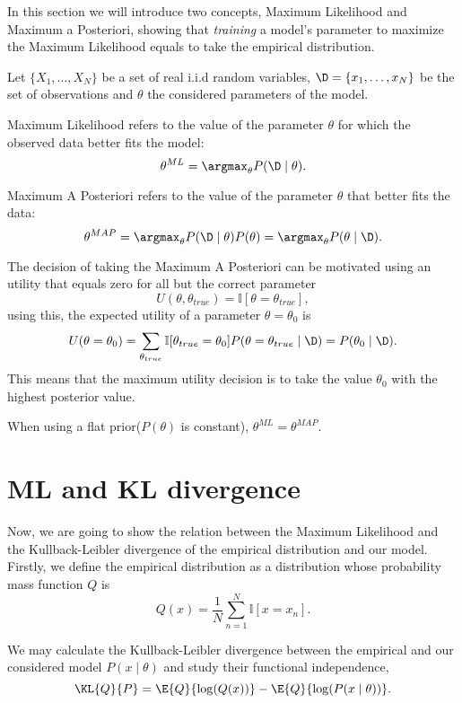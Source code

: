 
In this section we will introduce two concepts, Maximum Likelihood and Maximum a
Posteriori, showing that \emph{training} a model's parameter to maximize the
Maximum Likelihood equals to take the empirical distribution.

Let \(\{X_{1},\dots, X_{N}\}\) be a set of real i.i.d random variables, \(\D = \{x_{1}, \dots, x_{N}\}\) be the set of observations and \(\theta\) the considered parameters of the model.

\begin{definition}
  Maximum Likelihood refers to the value of the parameter \(\theta\) for which the observed data better fits the model:
  \[
    \theta^{ML} = \argmax_\theta P(\D \mid \theta).
  \]
\end{definition}

\begin{definition}
  Maximum A Posteriori refers to the value of the parameter \( \theta \) that better fits the data:
  \[
    \theta^{MAP} = \argmax_\theta P(\D \mid \theta)P(\theta) = \argmax_\theta P(\theta \mid \D).
  \]
\end{definition}

The decision of taking the Maximum A Posteriori can be motivated using an
utility that equals zero for all but the correct parameter
\[
  U(\theta, \theta_{true}) = \mathbb{I}[\theta = \theta_{true}],
\]
using this, the expected utility of a parameter \(\theta = \theta_0\) is
\[
  U(\theta = \theta_0) = \sum_{\theta_{true}}\mathbb{I}[\theta_{true} = \theta_0]P(\theta = \theta_{true}  \mid  \D) = P(\theta_0  \mid  \D).
\]
This means that the maximum utility decision is to take the value \(\theta_0\)
with the highest posterior value.

\begin{remark}
  When using a flat prior(\(P(\theta)\) is constant), \(\theta^{ML}= \theta ^{MAP}\).
\end{remark}

\section{ML and KL divergence}

Now, we are going to show the relation between the Maximum Likelihood and the
Kullback-Leibler divergence of the empirical distribution and our model.
Firstly, we define the empirical distribution as a distribution whose probability mass function
\(Q\) is
\[
  Q(x) = \frac{1}{N}\sum_{n = 1}^N \mathbb{I}[x = x_n].
\]

We may calculate the Kullback-Leibler divergence between the empirical and our considered model \(P(x \mid \theta)\) and study their functional independence,
\[
  \KL{Q}{P} = \E{Q}{\log(Q(x))} - \E{Q}{\log(P(x \mid \theta))}.
\]

